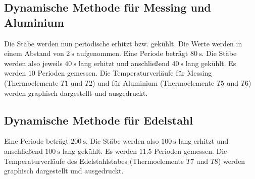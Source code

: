 \subsection{Dynamische Methode für Messing und Aluminium}
Die Stäbe werden nun periodische erhitzt bzw. gekühlt.
Die Werte werden in einem Abstand von $\SI{2}{\second}$ aufgenommen.
Eine Periode beträgt $\SI{80}{\second}$. Die Stäbe werden also jeweils
$\SI{40}{\second}$ lang erhitzt und anschließend $\SI{40}{\second}$
lang gekühlt.
Es werden $\num{10}$ Perioden
gemessen. %
Die Temperaturverläufe für Messing (Thermoelemente $T1$ und $T2$)
und für Aluminium (Thermoelemente $T5$ und $T6$)
werden graphisch dargestellt und ausgedruckt.

\subsection{Dynamische Methode für Edelstahl}
Eine Periode beträgt $\SI{200}{\second}$.
Die Stäbe werden also $\SI{100}{\second}$ lang erhitzt und anschließend 
$\SI{100}{\second}$ lang gekühlt.
Es werden $\num{11.5}$ Perioden gemessen.
Die Temperaturverläufe des Edelstahlstabes (Thermoelemente $T7$ und $T8$)
werden graphisch dargestellt und ausgedruckt.